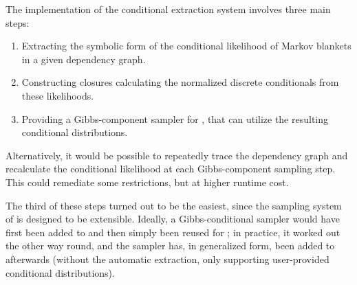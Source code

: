 The implementation of the conditional extraction system involves three main steps:
\begin{enumerate}
  \firmlist
\item Extracting the symbolic form of the conditional likelihood of Markov blankets in a given
  dependency graph.
\item Constructing closures calculating the normalized discrete conditionals from these likelihoods.
\item Providing a Gibbs-component sampler for \turingjl{}, that can utilize the resulting
  conditional distributions.
\end{enumerate}
Alternatively, it would be possible to repeatedly trace the dependency graph and recalculate the
conditional likelihood at each Gibbs-component sampling step.  This could remediate some
restrictions, but at higher runtime cost.

The third of these steps turned out to be the easiest, since the sampling system of \turingjl{} is
designed to be extensible.  Ideally, a Gibbs-conditional sampler would have first been added to
\turingjl{} and then simply been reused for \autogibbsjl{}; in practice, it worked out the other way
round, and the \autogibbsjl{} sampler has, in generalized form, been added to \turingjl{} afterwards
(without the automatic extraction, only supporting user-provided conditional distributions).

